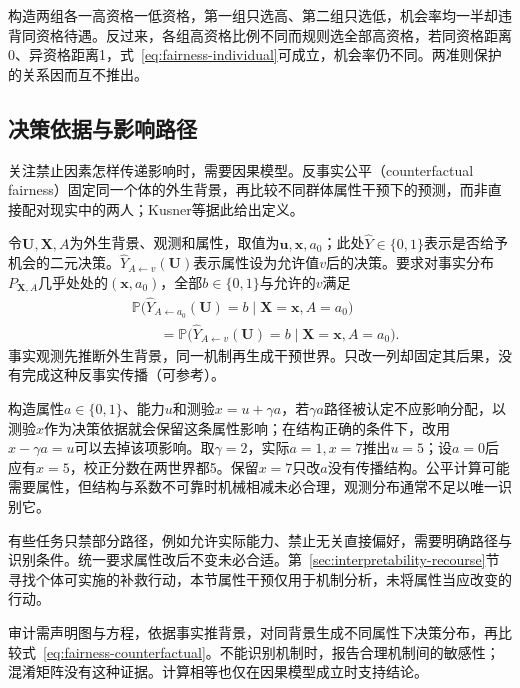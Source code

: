 构造两组各一高资格一低资格，第一组只选高、第二组只选低，机会率均一半却违背同资格待遇。反过来，各组高资格比例不同而规则选全部高资格，若同资格距离0、异资格距离1，式~\eqref{eq:fairness-individual}可成立，机会率仍不同。两准则保护的关系因而互不推出。

\subsection{决策依据与影响路径}
\label{sec:fairness-counterfactual-comparison}

关注禁止因素怎样传递影响时，需要因果模型。反事实公平（counterfactual fairness）固定同一个体的外生背景，再比较不同群体属性干预下的预测，而非直接配对现实中的两人；Kusner等据此给出定义。

令$\bm U,\bm X,A$为外生背景、观测和属性，取值为$\bm u,\bm x,a_0$；此处$\hat Y\in\{0,1\}$表示是否给予机会的二元决策。$\hat Y_{A\leftarrow v}(\bm U)$表示属性设为允许值$v$后的决策。要求对事实分布$P_{\bm X,A}$几乎处处的$(\bm{x},a_0)$，全部$b\in\{0,1\}$与允许的$v$满足
\begin{equation}
\begin{aligned}
 &\mathbb P\bigl(\hat Y_{A\leftarrow a_0}(\bm U)=b
       \mid\bm X=\bm x,A=a_0\bigr)\\
 &\qquad=\mathbb P\bigl(\hat Y_{A\leftarrow v}(\bm U)=b
       \mid\bm X=\bm x,A=a_0\bigr).
\end{aligned}
 \label{eq:fairness-counterfactual}
\end{equation}
事实观测先推断外生背景，同一机制再生成干预世界。只改一列却固定其后果，没有完成这种反事实传播（可参考）。

构造属性$a\in\{0,1\}$、能力$u$和测验$x=u+\gamma a$，若$\gamma a$路径被认定不应影响分配，以测验$x$作为决策依据就会保留这条属性影响；在结构正确的条件下，改用$x-\gamma a=u$可以去掉该项影响。取$\gamma=2$，实际$a=1,x=7$推出$u=5$；设$a=0$后应有$x=5$，校正分数在两世界都5。保留$x=7$只改$a$没有传播结构。公平计算可能需要属性，但结构与系数不可靠时机械相减未必合理，观测分布通常不足以唯一识别它。

有些任务只禁部分路径，例如允许实际能力、禁止无关直接偏好，需要明确路径与识别条件。统一要求属性改后不变未必合适。第~\ref{sec:interpretability-recourse}节寻找个体可实施的补救行动，本节属性干预仅用于机制分析，未将属性当应改变的行动。

审计需声明图与方程，依据事实推背景，对同背景生成不同属性下决策分布，再比较式~\eqref{eq:fairness-counterfactual}。不能识别机制时，报告合理机制间的敏感性；混淆矩阵没有这种证据。计算相等也仅在因果模型成立时支持结论。

